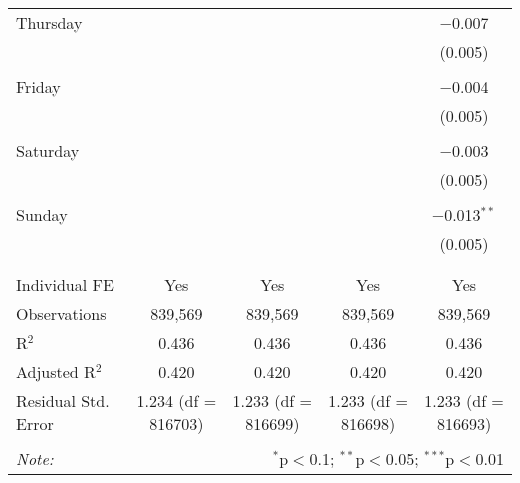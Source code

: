 \documentclass[
]{article}
\begin{document}
\begin{table}[!htbp]
{\begin{tabular}{@{\extracolsep{5pt}}lcccc}
 Thursday &  &  &  & $-$0.007 \\ 
  &  &  &  & (0.005) \\ 
  & & & & \\ 
 Friday &  &  &  & $-$0.004 \\ 
  &  &  &  & (0.005) \\ 
  & & & & \\ 
 Saturday &  &  &  & $-$0.003 \\ 
  &  &  &  & (0.005) \\ 
  & & & & \\ 
 Sunday &  &  &  & $-$0.013$^{**}$ \\ 
  &  &  &  & (0.005) \\ 
  & & & & \\ 
\hline \\[-1.8ex] 
Individual FE & Yes & Yes & Yes & Yes \\ 
Observations & 839,569 & 839,569 & 839,569 & 839,569 \\ 
R$^{2}$ & 0.436 & 0.436 & 0.436 & 0.436 \\ 
Adjusted R$^{2}$ & 0.420 & 0.420 & 0.420 & 0.420 \\ 
Residual Std. Error & 1.234 (df = 816703) & 1.233 (df = 816699) & 1.233 (df = 816698) & 1.233 (df = 816693) \\ 
\hline 
\hline \\[-1.8ex] 
\textit{Note:}  & \multicolumn{4}{r}{$^{*}$p$<$0.1; $^{**}$p$<$0.05; $^{***}$p$<$0.01} \\ 
\end{tabular}
} 
\end{table} 
\newpage
\end{document}
